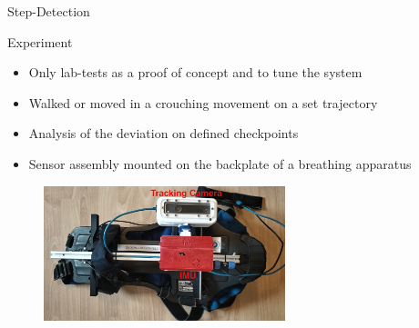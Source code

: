 \documentclass[aspectratio=169]{beamer}
\begin{document}
{\begin{frame}{Step-Detection}
		
		
	\end{frame}
	
	\begin{frame}{Experiment}
		\begin{itemize}
			\item Only lab-tests as a proof of concept and to tune the system
			\item Walked or moved in a crouching movement on a set trajectory
			\item Analysis of the deviation on defined checkpoints
			\item Sensor assembly mounted on the backplate of a breathing apparatus
		\end{itemize}
		\begin{figure}
			\centering
			\includegraphics[width=7cm]{../Conference_Paper/Assembly.jpg}
		\end{figure}
		
	\end{frame}
	
}
\end{document}
